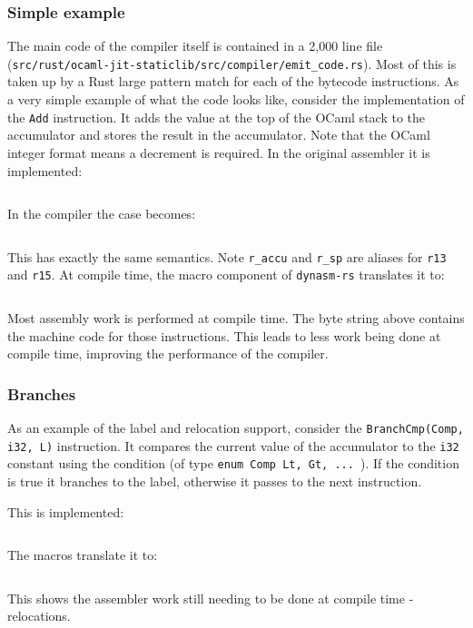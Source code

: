 \subsubsection{Simple example}

The main code of the compiler itself is contained in a 2,000 line file
(\texttt{src/rust/ocaml-jit-staticlib/src/compiler/emit\_code.rs}). Most of this is taken up by a
Rust large pattern match for each of the bytecode instructions. As a very simple example of what
the code looks like, consider the implementation of the \texttt{Add} instruction. It adds the value
at the top of the OCaml stack to the accumulator and stores the result in the accumulator. Note
that the OCaml integer format means a decrement is required. In the original assembler it is
implemented:

\inputminted{c}{snippets/add.c}

In the compiler the case becomes:

\inputminted{rust}{snippets/add.rs}

This has exactly the same semantics. Note \texttt{r\_accu} and \texttt{r\_sp}
are aliases for \texttt{r13} and \texttt{r15}.	At compile time, the macro component of
\texttt{dynasm-rs} translates it to:

\inputminted{rust}{snippets/add_comp.rs}

Most assembly work is performed at compile time. The byte string above contains the machine code
for
those instructions. This leads to less work being done at compile time, improving the performance
of the compiler.

\subsubsection{Branches}

As an example of the label and relocation support, consider the \texttt{BranchCmp(Comp, i32, L)}
instruction. It
compares the current value of the accumulator to the \texttt{i32} constant using the condition (of
type \texttt{enum Comp {Lt, Gt, ... }}). If the condition is true it branches to the label,
otherwise it passes to the next instruction.

This is implemented:

\inputminted{rust}{snippets/branchcmp.rs}

The macros translate it to:

\inputminted{rust}{snippets/branchcmp_comp.rs}

This shows the assembler work still needing to be done at compile time - relocations.

